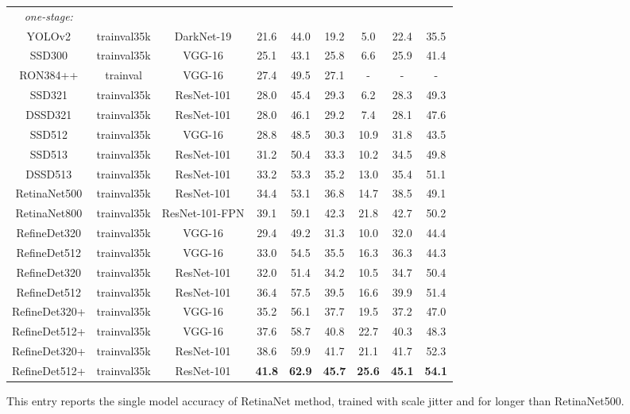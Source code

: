 \documentclass[10pt,twocolumn,letterpaper]{article}
\begin{document}
\begin{table*}[t]
\begin{threeparttable}
\begin{tabular}{c|c|c|ccc|ccc}
\hline
\hline
\textit{one-stage:} & & & & & & & & \\
YOLOv2 \cite{DBLP:journals/corr/RedmonF16} &trainval35k &DarkNet-19\cite{DBLP:journals/corr/RedmonF16} &21.6 &44.0 &19.2 &5.0 &22.4 &35.5\\
SSD300 \cite{DBLP:conf/eccv/LiuAESRFB16} &trainval35k &VGG-16 &25.1 &43.1 &25.8 &6.6 &25.9 &41.4\\
RON384++ \cite{DBLP:conf/cvpr/KongSYLLC17} &trainval &VGG-16 &27.4 &49.5 &27.1 &- &- &- \\
SSD321 \cite{DBLP:journals/corr/FuLRTB17} &trainval35k &ResNet-101 &28.0 &45.4 &29.3 &6.2 &28.3 &49.3\\
DSSD321 \cite{DBLP:journals/corr/FuLRTB17} &trainval35k &ResNet-101 &28.0 &46.1 &29.2 &7.4 &28.1 &47.6\\
SSD512 \cite{DBLP:conf/eccv/LiuAESRFB16} &trainval35k &VGG-16 &28.8 &48.5 &30.3 &10.9 &31.8 &43.5\\
SSD513 \cite{DBLP:journals/corr/FuLRTB17} &trainval35k &ResNet-101 &31.2 &50.4 &33.3 &10.2 &34.5 &49.8 \\
DSSD513 \cite{DBLP:journals/corr/FuLRTB17} &trainval35k &ResNet-101 &33.2 &53.3 &35.2 &13.0 &35.4 &51.1 \\
RetinaNet500 \cite{DBLP:conf/iccv/LinPRK17} &trainval35k &ResNet-101 &34.4 &53.1 &36.8 &14.7 &38.5 &49.1 \\
RetinaNet800 \cite{DBLP:conf/iccv/LinPRK17}\tnote{} &trainval35k &ResNet-101-FPN &39.1 &59.1 &42.3 &21.8 &42.7 &50.2 \\
\hline
RefineDet320  &trainval35k &VGG-16 &29.4 &49.2 &31.3 &10.0 &32.0 &44.4\\
RefineDet512  &trainval35k &VGG-16 &33.0 &54.5 &35.5 &16.3 &36.3 &44.3 \\
RefineDet320  &trainval35k &ResNet-101 &32.0 &51.4 &34.2 &10.5 &34.7 &50.4 \\
RefineDet512  &trainval35k &ResNet-101 &36.4 &57.5 &39.5 &16.6 &39.9 &51.4 \\
RefineDet320+ &trainval35k &VGG-16 &35.2 &56.1 &37.7 &19.5 &37.2 &47.0 \\
RefineDet512+ &trainval35k &VGG-16 &37.6 &58.7 &40.8 &22.7 &40.3 &48.3\\
RefineDet320+ &trainval35k &ResNet-101 &38.6 &59.9 &41.7 &21.1 &41.7 &52.3 \\
RefineDet512+ &trainval35k &ResNet-101 &{\bf 41.8} &{\bf 62.9} &{\bf 45.7} &{\bf 25.6} &{\bf 45.1} &{\bf 54.1} \\
\bottomrule[1.5pt]
\end{tabular}
\begin{tablenotes}
\item[] This entry reports the single model accuracy of RetinaNet method, trained with scale jitter and for  longer than RetinaNet500.
\end{tablenotes}
\end{threeparttable}
\label{tab:coco}
\end{table*}
\end{document}
